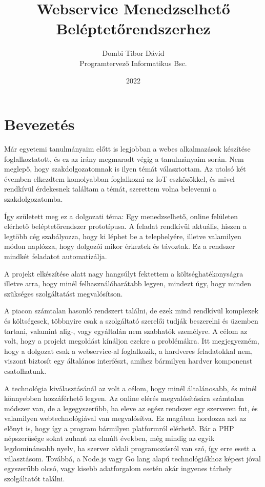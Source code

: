 \documentclass[a4paper,12pt]{thesis-ekf}
\theoremstyle{definition}
\begin{document}
	\title{Webservice Menedzselhető Beléptetőrendszerhez}
	\author{Dombi Tibor Dávid\\Programtervező Informatikus Bsc.}
	\date{2022}
	\maketitle
	\tableofcontents
	
	\chapter*{Bevezetés}\label{ch-ThesisIntro}
	Már egyetemi tanulmányaim előtt is legjobban a webes alkalmazások készítése foglalkoztatott, és ez az irány megmaradt végig a tanulmányaim során. Nem meglepő, hogy szakdolgozatomnak is ilyen témát választottam.
	Az utolsó két évemben elkezdtem komolyabban foglalkozni az IoT eszközökkel, és mivel rendkívül érdekesnek találtam a témát, szerettem volna belevenni a szakdolgozatomba.
	
	Így született meg ez a dolgozati téma: Egy menedzselhető, online felületen elérhető beléptetőrendszer prototípusa. A feladat rendkívül aktuális, hiszen a legtöbb cég szabályozza, hogy ki léphet be a telephelyére, illetve valamilyen módon naplózza, hogy dolgozói mikor érkeztek és távoztak. Ez a rendszer mindkét feladatot automatizálja.
	
	A projekt elkészítése alatt nagy hangsúlyt fektettem a költséghatékonyságra illetve arra, hogy minél felhasználóbarátabb legyen, mindezt úgy, hogy minden szükséges szolgáltatást megvalósítson.
	
	A piacon számtalan hasonló rendszert találni, de ezek mind rendkívül komplexek és költségesek, többnyire csak a szolgáltató szerelői tudják beszerelni és üzemben tartani, valamint alig-, vagy egyáltalán nem szabhatók személyre. A célom az volt, hogy a projekt megoldást kínáljon ezekre a problémákra. Itt megjegyezném, hogy a dolgozat csak a webservice-al foglalkozik, a hardveres feladatokkal nem, viszont biztosít egy általános interfészt, amihez bármilyen hardver komponenst csatolhatunk.
	
	A technológia kiválasztásánál az volt a célom, hogy minél általánosabb, és minél könnyebben hozzáférhető legyen. Az online elérés megvalósítására számtalan módszer van, de a legegyszerűbb, ha eleve az egész rendszer egy szerveren fut, és valamilyen webtechnológiával van megvalósítva. Ez magában hordozza azt az előnyt is, hogy így a program bármilyen platformról elérhető. Bár a PHP népszerűsége sokat zuhant az elmúlt években\cite{octoverse}, még mindig az egyik legdominánsabb nyelv, ha szerver oldali programozásról van szó\cite{phpstatistics}, így erre esett a választásom. Továbbá, a Node.js vagy Go lang alapú technológiákhoz képest jóval egyszerűbb olcsó, vagy kisebb adatforgalom esetén akár ingyenes tárhely szolgáltatót találni.
	
\end{document}
